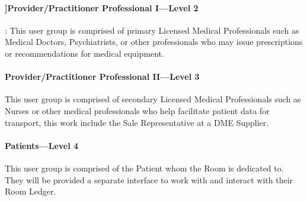   \paragraph{]Provider/Practitioner Professional I---Level 2}:
  This user group is comprised of primary Licensed Medical Professionals such as Medical Doctors, Psychiatrists, or other professionals who may issue prescriptions or recommendations for medical equipment.

  \paragraph{Provider/Practitioner Professional II---Level 3}
  This user group is comprised of secondary Licensed Medical Professionals such as Nurses or other medical professionals who help facilitate patient data for transport, this work include the Sale Representative at a DME Supplier.

  \paragraph{Patients---Level 4}
  This user group is comprised of the Patient whom the Room is dedicated to. They will be provided a separate interface to work with and interact with their Room Ledger.




